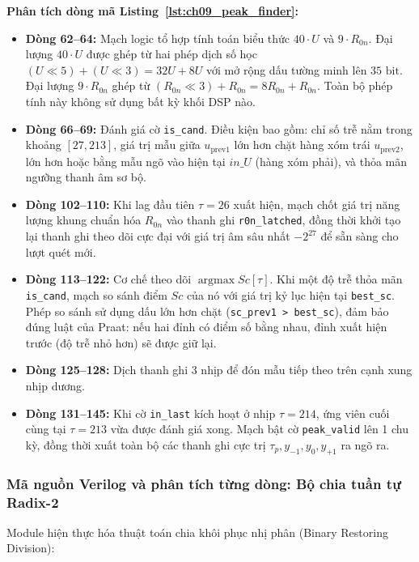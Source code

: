 \textbf{Phân tích dòng mã Listing~\ref{lst:ch09_peak_finder}:}
\begin{itemize}[leftmargin=1.5em, itemsep=2pt]
    \item \textbf{Dòng 62--64:} Mạch logic tổ hợp tính toán biểu thức $40 \cdot U$ và $9 \cdot R_{0n}$. Đại lượng $40 \cdot U$ được ghép từ hai phép dịch số học $(U \ll 5) + (U \ll 3) = 32U + 8U$ với mở rộng dấu tường minh lên $35\text{ bit}$. Đại lượng $9 \cdot R_{0n}$ ghép từ $(R_{0n} \ll 3) + R_{0n} = 8R_{0n} + R_{0n}$. Toàn bộ phép tính này không sử dụng bất kỳ khối DSP nào.
    \item \textbf{Dòng 66--69:} Đánh giá cờ \texttt{is\_cand}. Điều kiện bao gồm: chỉ số trễ nằm trong khoảng $[27, 213]$, giá trị mẫu giữa $u_{\text{prev1}}$ lớn hơn chặt hàng xóm trái $u_{\text{prev2}}$, lớn hơn hoặc bằng mẫu ngõ vào hiện tại $in\_U$ (hàng xóm phải), và thỏa mãn ngưỡng thanh âm sơ bộ.
    \item \textbf{Dòng 102--110:} Khi lag đầu tiên $\tau = 26$ xuất hiện, mạch chốt giá trị năng lượng khung chuẩn hóa $R_{0n}$ vào thanh ghi \texttt{r0n\_latched}, đồng thời khởi tạo lại thanh ghi theo dõi cực đại với giá trị âm sâu nhất $-2^{27}$ để sẵn sàng cho lượt quét mới.
    \item \textbf{Dòng 113--122:} Cơ chế theo dõi $\operatorname{argmax} Sc[\tau]$. Khi một độ trễ thỏa mãn \texttt{is\_cand}, mạch so sánh điểm $Sc$ của nó với giá trị kỷ lục hiện tại \texttt{best\_sc}. Phép so sánh sử dụng dấu lớn hơn chặt (\texttt{sc\_prev1 > best\_sc}), đảm bảo đúng luật của Praat: nếu hai đỉnh có điểm số bằng nhau, đỉnh xuất hiện trước (độ trễ nhỏ hơn) sẽ được giữ lại.
    \item \textbf{Dòng 125--128:} Dịch thanh ghi 3 nhịp để đón mẫu tiếp theo trên cạnh xung nhịp dương.
    \item \textbf{Dòng 131--145:} Khi cờ \texttt{in\_last} kích hoạt ở nhịp $\tau = 214$, ứng viên cuối cùng tại $\tau = 213$ vừa được đánh giá xong. Mạch bật cờ \texttt{peak\_valid} lên 1 chu kỳ, đồng thời xuất toàn bộ các thanh ghi cực trị $\tau_p, y_{-1}, y_0, y_{+1}$ ra ngõ ra.
\end{itemize}

\subsubsection*{Mã nguồn Verilog và phân tích từng dòng: Bộ chia tuần tự Radix-2}
Module  hiện thực hóa thuật toán chia khôi phục nhị phân (Binary Restoring Division):

